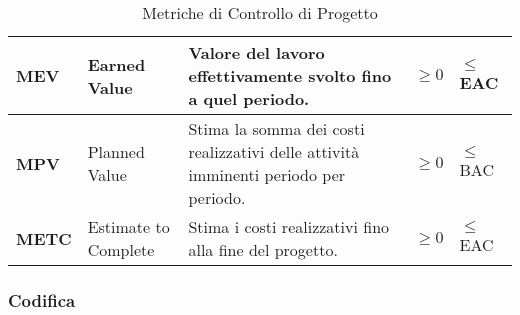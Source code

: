 \begin{table}[H]
\begin{tabular}{|C{1.5cm}|L{3cm}|L{4cm}|L{2.5cm}|L{2.5cm}|}
        \hline
        \textbf{MEV} & Earned Value & Valore del lavoro effettivamente svolto fino a quel periodo.
        & $\geq 0 $ & $\leq$ EAC  \\
        \hline
        \textbf{MPV} & Planned Value & Stima la somma dei costi realizzativi delle attività imminenti periodo 
        per periodo. & $\geq 0  $ & $ \leq$ BAC  \\
        \hline
        \textbf{METC} & Estimate to Complete &  Stima i costi realizzativi fino alla fine del progetto. & $\geq 0  $ & $ \leq$ EAC  \\
        \hline
    \end{tabular}
    \caption{Metriche di Controllo di Progetto}
    \label{tab:controllo_progetto}
\end{table}

\subsubsection{Codifica}
